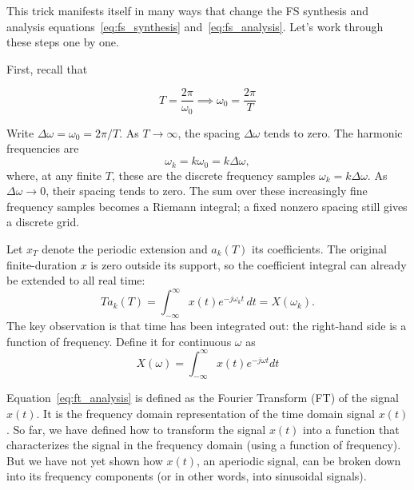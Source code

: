 This trick manifests itself in many ways that change the FS synthesis and analysis equations~\eqref{eq:fs_synthesis} and~\eqref{eq:fs_analysis}. Let's work through these steps one by one.

First, recall that 

\[  
T = \frac{2\pi}{\omega_0} \implies \omega_0 = \frac{2\pi}{T}
\]

Write $\Delta\omega=\omega_0=2\pi/T$. As $T\to\infty$, the spacing
$\Delta\omega$ tends to zero. The harmonic frequencies are
\[ 
\omega_k=k\omega_0=k\Delta\omega,
\]
where, at any finite $T$, these are the discrete frequency samples
$\omega_k=k\Delta\omega$. As $\Delta\omega\to0$, their spacing tends to
zero. The sum over these increasingly fine frequency samples becomes a
Riemann integral; a fixed nonzero spacing still gives a discrete grid.

Let $x_T$ denote the periodic extension and $a_k(T)$ its coefficients.
The original finite-duration $x$ is zero outside its support, so the
coefficient integral can already be extended to all real time:
\begin{equation*}
    T a_k(T)=\int_{-\infty}^{\infty}x(t)e^{-j\omega_k t}\,dt
    =X(\omega_k).
\end{equation*}
The key observation is that time has been integrated out: the right-hand
side is a function of frequency. Define it for continuous $\omega$ as
\begin{equation}
  \label{eq:ft_analysis}
    X(\omega) = \int_{-\infty}^{\infty} x(t) e^{-j\omega t} dt
\end{equation}

Equation~\eqref{eq:ft_analysis} is defined as the Fourier Transform (FT) of the signal $x(t)$. It is the frequency domain representation of the time domain signal $x(t)$. So far, we have defined how to transform the signal $x(t)$ into a function that characterizes the signal in the frequency domain (using a function of frequency). But we have not yet shown how $x(t)$, an aperiodic signal, can be broken down into its frequency components (or in other words, into sinusoidal signals). 

